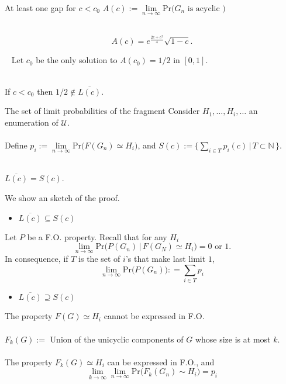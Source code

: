 \documentclass[handout, 11pt]{beamer}
\newcommand{\Ln}{\lim\limits_{n\to \infty}}
\begin{document}
\begin{frame}{At least one gap for $c<c_0$}
	$A(c):=\Ln \mathrm{Pr}\big( G_n \text{ is acyclic }\big)$\\~\\
	\begin{theorem}
		\[ A(c)=e^{\frac{2c+c^2}{4}}\sqrt{1-c}. \]	
	\end{theorem}
	~ \vfill
	Let $c_0$ be the only solution to $A(c_0)=1/2$ in $[0,1]$.\\~\\
	\begin{theorem}
		If $c<c_0$ then $1/2\notin \overline{L(c)}$.
	\end{theorem}
	
	
\end{frame}

\begin{frame}{The set of limit probabilities of the fragment}
	 Consider $H_1,\dots,H_i,\dots$ an enumeration of $\mathcal{U}$.
	 \\~\\
	 Define $p_i:=\Ln \mathrm{Pr}\Big( F(G_n)\simeq H_i\Big)$, and
	 $S(c):=\{ \sum_{i\in T} p_i(c) \, | \, T\subset \mathbb{N}\, \}$.
	 \\~\\
	 \begin{theorem}
	 $\overline{L(c)}=S(c)$.
	 \end{theorem}
	 
\end{frame}


\begin{frame}{}
We show an sketch of the proof. 
\vspace*{2mm}
\begin{itemize}[leftmargin=5mm]
	\item[\textbullet] $\overline{L(c)}\subseteq S(c)$
\end{itemize}
\vfill
Let $P$ be a F.O. property. Recall that for any $H_i$
\[
\Ln \mathrm{Pr}\big( P(G_n) \,|\, F(G_N)\simeq H_i \big)
= 0 \text{ or } 1.
\]
In consequence, if $T$ is the set of $i$'s that make last limit
$1$, 
\[
\Ln \mathrm{Pr}\big( P(G_n)\big): = \sum_{i\in T} p_i
\]
\end{frame}
\begin{frame}{}
\begin{itemize}[leftmargin=5mm]
	\item[\textbullet] $\overline{L(c)}\supseteq S(c)$
\end{itemize}
\vfill
The property $F(G)\simeq H_i$ cannot be expressed in F.O. \\~
\\
$F_k(G):=$ Union of the unicyclic components of $G$ whose size is at
most $k$. \\~\\
The property $F_k(G)\simeq H_i$ can be expressed in F.O., and
\[
\lim\limits_{k\to \infty} \Ln
\mathrm{Pr}\big( F_k(G_n)\sim H_i \big) = p_i 
\]
\end{frame}
\end{document}
